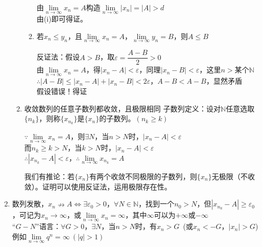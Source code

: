 \documentclass[11pt,fleqn]{book} %
\begin{document}
\begin{enumerate}
\begin{enumerate}[label=(\arabic*)]
\begin{enumerate}[label=(\roman*)]
                  \begin{prove}
                   由$\lim\limits_{n\rightarrow \infty} x_n=A$构造$\lim\limits_{n\rightarrow \infty} |x_n|=|A|>d$\\
                   由(i)即可得证。
                \end{prove}
               \item 若$x_n \leqslant y_n$，且$\lim\limits_{n\rightarrow \infty} x_n=A$，$\lim\limits_{n\rightarrow \infty} y_n=B$，则$A\leqslant B$
                   \begin{prove}
                   反证法：假设$A>B$，取$\varepsilon = \dfrac{A-B}{2}>0$\\
                   由$\lim\limits_{n\rightarrow \infty} x_n=A$，得$|x_n-A|<\varepsilon$，同理$|x_n-B|<\varepsilon$，这里$n>$某个$\mathds{N}$\\
                    $\therefore |A-B|\leqslant |x_n-A|+|x_n-B|<2\varepsilon$，$A-B<A-B$，显然矛盾\\假设错误！得证
                \end{prove}
             \end{enumerate}
\item 收敛数列的任意子数列都收敛，且极限相同
子数列定义：设对$\mathds{N}$任意选取$\{n_k\}$，则称$\{x_{n_k}\}$是$\{x_n\}$的子数列。$(n_k\geqslant k)$
    \begin{prove}
    $\because \lim\limits_{n\rightarrow \infty} x_n=A$，则$\exists N$，当$n>N$时，$|x_n-A|<\varepsilon$\\
    而$n_k\geqslant k>N$，当$k>N$时，$|x_n-A|<\varepsilon$\\
    $\therefore |x_{n_k}-A|<\varepsilon$，$\therefore \lim\limits_{n\rightarrow \infty} x_{n_k}=A$
    \end{prove}
我们有推论：若$\{x_n\}$有两个收敛不同极限的子数列，则$\{x_n\}$无极限（不收敛）。证明可以使用反证法，运用极限存在性。
\end{enumerate}
\item 数列发散，$x_n \nrightarrow A\Leftrightarrow \exists \varepsilon_0>0$，$\forall N \in \mathds{N}$，找到一个$n_0>N$，但$|x_{n_0}-A|\geqslant \varepsilon_0$，可记为$x_n\rightarrow \infty$，或$\lim\limits_{n\rightarrow \infty} x_n=\infty$，其中$\infty$可以为$+\infty$或$-\infty$\\
    “$G-N$”语言：$\forall G>0$，$\exists N$，当$n>N$时，有$x_n>G$\ (或$x_n<-G$，$|x_n|>G$)\\
    例如$\lim\limits_{n\rightarrow \infty} q^n=\infty\ (|q|>1)$

\end{enumerate}
\end{document}
